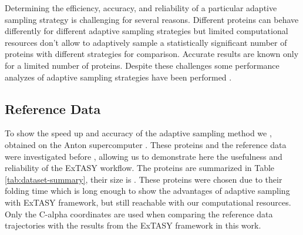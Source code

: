Determining the efficiency, accuracy, and reliability of a particular adaptive
sampling strategy is challenging for several reasons. Different proteins can
behave differently for different adaptive sampling strategies but limited
computational resources don't allow to adaptively sample a statistically
significant number of proteins with different strategies for comparison.
Accurate results are known only for a limited number of proteins. Despite
these challenges some performance analyzes of adaptive sampling strategies
have been performed
\cite{preto2014fast,weber2011characterization,bowman2010enhanced,Fabritiis-2014,
Adstrategies2018}. 

\subsection{\label{sec:Reference} Reference Data}

\begin{table}[H]
\centering
\caption{Adaptively sampled proteins in this study}
\label{tab:dataset-summary}
\end{table}
To show the speed up and accuracy of the adaptive sampling method we , obtained
on the Anton supercomputer \cite{lindorff2011}. These proteins and the
reference data were investigated before \cite{reanalyze1, reanalyze2},
allowing us to demonstrate here the usefulness and reliability of the ExTASY
workflow. The  proteins are summarized in Table \ref{tab:dataset-summary},
their size is .
These proteins were chosen due to their folding time which is long enough to
show the advantages of adaptive sampling with ExTASY framework, but still
reachable with our computational resources. Only the C-alpha coordinates are
used when comparing the reference data trajectories with the results from the
ExTASY framework in this work. 


